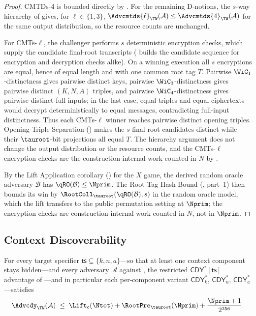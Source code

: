 \begin{proof}
CMTDs-4 is bounded directly by . For the remaining
D-notions, the $s$-way hierarchy of \cite[\S3, Fig.~5 and
App.~A]{BH22} gives, for $\ell \in \{1,3\}$,
$\Advcmtds{\ell}_\TW(\mathcal{A}) \leq
\Advcmtds{4}_\TW(\mathcal{A})$ for the same output distribution, so the
resource counts are unchanged.

For CMTs-$\ell$, the challenger performs $s$ deterministic encryption
checks, which supply the candidate final-root transcripts
( builds the candidate sequence for
encryption and decryption checks alike). On a winning execution all
$s$ encryptions are equal, hence of equal length and with one common root
tag $T$. Pairwise $\WiC_1$-distinctness gives pairwise distinct keys,
pairwise $\WiC_3$-distinctness gives pairwise distinct $(K,N,A)$ triples,
and pairwise $\WiC_4$-distinctness gives pairwise distinct full inputs; in
the last case, equal triples and equal ciphertexts would decrypt
deterministically to equal messages, contradicting full-input
distinctness. Thus each CMTs-$\ell$ winner reaches pairwise distinct
opening triples. Opening Triple Separation () makes
the $s$ final-root candidates distinct while their $\tauroot$-bit
projections all equal $T$.
The hierarchy argument does not change the output distribution or the
resource counts, and the CMTs-$\ell$ encryption checks are the
construction-internal work counted in $N$ by .

By the Lift Application corollary () for the
$X$ game, the derived random oracle adversary $\mathcal{B}$ has
$\qRO(\mathcal{B}) \leq \Nprim$. The Root Tag Hash Bound
(, part~1) then bounds its win by
$\RootColl_{\tauroot}(\qRO(\mathcal{B}), s)$ in the random oracle model,
which the lift transfers to the public permutation setting at $\Nprim$;
the encryption checks are construction-internal work counted in $N$, not
in $\Nprim$.
\end{proof}

\subsection{Context Discoverability}

\begin{theorem}
\label{thm:cdy-full}
For every target specifier $\mathsf{ts} \subsetneq \{k, n, a\}$---so that
at least one context component stays hidden---and every adversary
$\mathcal{A}$ against \TW{}, the restricted $\mathsf{CDY}^\ast[\mathsf{ts}]$
advantage
of \cite[Fig.~5]{MLGR23}---and in particular each per-component variant
$\mathsf{CDY}^\ast_k$, $\mathsf{CDY}^\ast_n$, $\mathsf{CDY}^\ast_a$---satisfies
\[
  \Advcdy_\TW(\mathcal{A})
  \;\leq\;
  \Lift_c(\Ntot) + \RootPre_{\tauroot}(\Nprim) + \frac{\Nprim+1}{2^{256}}.
\]
\end{theorem}

